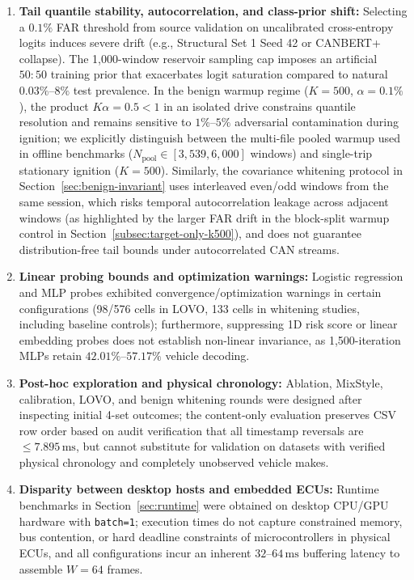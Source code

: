 \documentclass[12pt, a4paper, reqno, oneside]{book}
\DeclareRobustCommand{\code}[1]{\nolinkurl{#1}}
\begin{document}
\begin{enumerate}
    \item \textbf{Tail quantile stability, autocorrelation, and class-prior shift:} Selecting a $0.1\%$ FAR threshold from source validation on uncalibrated cross-entropy logits induces severe drift (e.g., Structural Set 1 Seed 42 or CANBERT+ collapse). The 1,000-window reservoir sampling cap imposes an artificial $50:50$ training prior that exacerbates logit saturation compared to natural $0.03\%\text{--}8\%$ test prevalence. In the benign warmup regime ($K=500$, $\alpha=0.1\%$), the product $K\alpha = 0.5 < 1$ in an isolated drive constrains quantile resolution and remains sensitive to $1\%\text{--}5\%$ adversarial contamination during ignition; we explicitly distinguish between the multi-file pooled warmup used in offline benchmarks ($N_{\text{pool}} \in [3{,}539, 6{,}000]$ windows) and single-trip stationary ignition ($K=500$). Similarly, the covariance whitening protocol in Section~\ref{sec:benign-invariant} uses interleaved even/odd windows from the same session, which risks temporal autocorrelation leakage across adjacent windows (as highlighted by the larger FAR drift in the block-split warmup control in Section~\ref{subsec:target-only-k500}), and does not guarantee distribution-free tail bounds under autocorrelated CAN streams.
    \item \textbf{Linear probing bounds and optimization warnings:} Logistic regression and MLP probes exhibited convergence/optimization warnings in certain configurations (98/576 cells in LOVO, 133 cells in whitening studies, including baseline controls); furthermore, suppressing 1D risk score or linear embedding probes does not establish non-linear invariance, as 1,500-iteration MLPs retain $42.01\%\text{--}57.17\%$ vehicle decoding.
    \item \textbf{Post-hoc exploration and physical chronology:} Ablation, MixStyle, calibration, LOVO, and benign whitening rounds were designed after inspecting initial 4-set outcomes; the content-only evaluation preserves CSV row order based on audit verification that all timestamp reversals are $\le 7.895\,\text{ms}$, but cannot substitute for validation on datasets with verified physical chronology and completely unobserved vehicle makes.
    \item \textbf{Disparity between desktop hosts and embedded ECUs:} Runtime benchmarks in Section~\ref{sec:runtime} were obtained on desktop CPU/GPU hardware with \code{batch=1}; execution times do not capture constrained memory, bus contention, or hard deadline constraints of microcontrollers in physical ECUs, and all configurations incur an inherent $32\text{--}64\,\text{ms}$ buffering latency to assemble $W=64$ frames.
\end{enumerate}
\end{document}
